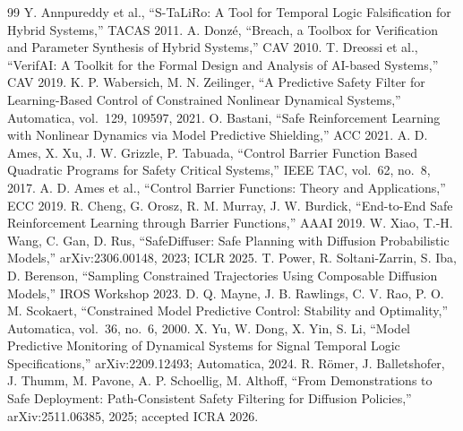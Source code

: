 \documentclass[a4paper,12pt]{article}
\begin{document}
\begin{thebibliography}{99}
 Y. Annpureddy et al., ``S-TaLiRo: A Tool for Temporal Logic Falsification for Hybrid Systems,'' TACAS 2011.
 A. Donzé, ``Breach, a Toolbox for Verification and Parameter Synthesis of Hybrid Systems,'' CAV 2010.
 T. Dreossi et al., ``VerifAI: A Toolkit for the Formal Design and Analysis of AI-based Systems,'' CAV 2019.
 K. P. Wabersich, M. N. Zeilinger, ``A Predictive Safety Filter for Learning-Based Control of Constrained Nonlinear Dynamical Systems,'' Automatica, vol.~129, 109597, 2021.
 O. Bastani, ``Safe Reinforcement Learning with Nonlinear Dynamics via Model Predictive Shielding,'' ACC 2021.
 A. D. Ames, X. Xu, J. W. Grizzle, P. Tabuada, ``Control Barrier Function Based Quadratic Programs for Safety Critical Systems,'' IEEE TAC, vol.~62, no.~8, 2017.
 A. D. Ames et al., ``Control Barrier Functions: Theory and Applications,'' ECC 2019.
 R. Cheng, G. Orosz, R. M. Murray, J. W. Burdick, ``End-to-End Safe Reinforcement Learning through Barrier Functions,'' AAAI 2019.
 W. Xiao, T.-H. Wang, C. Gan, D. Rus, ``SafeDiffuser: Safe Planning with Diffusion Probabilistic Models,'' arXiv:2306.00148, 2023; ICLR 2025.
 T. Power, R. Soltani-Zarrin, S. Iba, D. Berenson, ``Sampling Constrained Trajectories Using Composable Diffusion Models,'' IROS Workshop 2023.
 D. Q. Mayne, J. B. Rawlings, C. V. Rao, P. O. M. Scokaert, ``Constrained Model Predictive Control: Stability and Optimality,'' Automatica, vol.~36, no.~6, 2000.
 X. Yu, W. Dong, X. Yin, S. Li, ``Model Predictive Monitoring of Dynamical Systems for Signal Temporal Logic Specifications,'' arXiv:2209.12493; Automatica, 2024.
 R. Römer, J. Balletshofer, J. Thumm, M. Pavone, A. P. Schoellig, M. Althoff, ``From Demonstrations to Safe Deployment: Path-Consistent Safety Filtering for Diffusion Policies,'' arXiv:2511.06385, 2025; accepted ICRA 2026.
\end{thebibliography}
\end{document}
